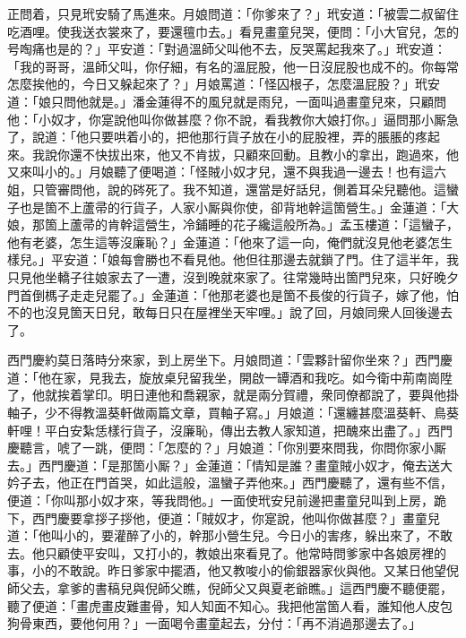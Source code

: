 正問着，只見玳安騎了馬進來。月娘問道：「你爹來了？」玳安道：「被雲二叔留住吃酒哩。使我送衣裳來了，要還氊巾去。」看見畫童兒哭，便問：「小大官兒，怎的号啕痛也是的？」平安道：「對過溫師父叫他不去，反哭罵起我來了。」玳安道：「我的哥哥，溫師父叫，你仔細，有名的溫屁股，他一日沒屁股也成不的。你每常怎麼挨他的，今日又躲起來了？」{}月娘罵道：「怪囚根子，怎麼溫屁股？」玳安道：「娘只問他就是。」潘金蓮得不的風兒就是雨兒，{}一面叫過畫童兒來，只顧問他：「小奴才，你寔說他叫你做甚麼？你不說，看我教你大娘打你。」逼問那小厮急了，說道：「他只要哄着小的，把他那行貨子放在小的屁股裡，弄的脹脹的疼起來。我說你還不快拔出來，他又不肯拔，只顧來回動。且教小的拿出，跑過來，他又來叫小的。」月娘聽了便喝道：「怪賊小奴才兒，還不與我過一邊去！也有這六姐，只管審問他，說的硶死了。我不知道，還當是好話兒，側着耳朵兒聽他。這蠻子也是箇不上蘆帚的行貨子，人家小厮與你使，卻背地幹這箇營生。」金蓮道：「大娘，那箇上蘆帚的肯幹這營生，{}冷鋪睡的花子纔這般所為。」{}孟玉樓道：「這蠻子，他有老婆，怎生這等沒廉恥？」金蓮道：「他來了這一向，俺們就沒見他老婆怎生樣兒。」平安道：「娘每會勝也不看見他。他但往那邊去就鎖了門。住了這半年，我只見他坐轎子往娘家去了一遭，沒到晚就來家了。往常幾時出箇門兒來，只好晚夕門首倒榪子走走兒罷了。」金蓮道：「他那老婆也是箇不長俊的行貨子，嫁了他，怕不的也沒見箇天日兒，敢每日只在屋裡坐天牢哩。」說了回，月娘同衆人回後邊去了。

西門慶約莫日落時分來家，到上房坐下。月娘問道：「雲夥計留你坐來？」西門慶道：「他在家，見我去，旋放桌兒留我坐，開啟一罈酒和我吃。如今衛中荊南崗陞了，他就挨着掌印。明日連他和喬親家，就是兩分賀禮，衆同僚都說了，要與他掛軸子，少不得教溫葵軒做兩篇文章，買軸子寫。」月娘道：「還纏甚麼溫葵軒、鳥葵軒哩！平白安紮恁樣行貨子，沒廉恥，傳出去教人家知道，把醜來出盡了。」西門慶聽言，唬了一跳，{}便問：「怎麼的？」月娘道：「你別要來問我，你問你家小厮去。」西門慶道：「是那箇小厮？」金蓮道：「情知是誰？畫童賊小奴才，俺去送大妗子去，他正在門首哭，如此這般，溫蠻子弄他來。」西門慶聽了，還有些不信，便道：「你叫那小奴才來，等我問他。」一面使玳安兒前邊把畫童兒叫到上房，跪下，西門慶要拿拶子拶他，{}便道：「賊奴才，你寔說，他叫你做甚麼？」畫童兒道：「他叫小的，要灌醉了小的，幹那小營生兒。{}今日小的害疼，躲出來了，不敢去。他只顧使平安叫，又打小的，教娘出來看見了。他常時問爹家中各娘房裡的事，小的不敢說。昨日爹家中擺酒，他又教唆小的偷銀器家伙與他。又某日他望倪師父去，拿爹的書稿兒與倪師父瞧，倪師父又與夏老爺瞧。」這西門慶不聽便罷，聽了便道：「畫虎畫皮難畫骨，知人知面不知心。我把他當箇人看，誰知他人皮包狗骨東西，要他何用？」{}一面喝令畫童起去，分付：「再不消過那邊去了。」


